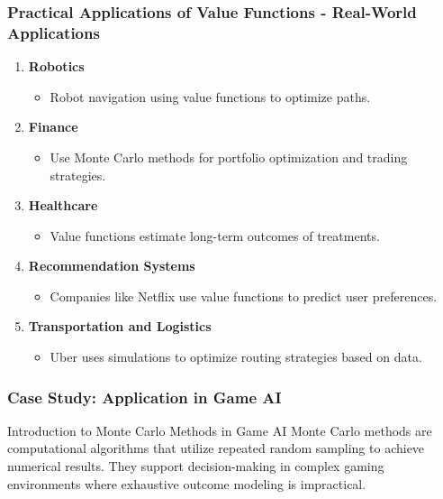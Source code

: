 \documentclass[aspectratio=169]{beamer}
\begin{document}
\begin{frame}[fragile]
  \frametitle{Practical Applications of Value Functions - Real-World Applications}
  
  \begin{enumerate}
    \item \textbf{Robotics}
      \begin{itemize}
        \item Robot navigation using value functions to optimize paths.
      \end{itemize}
      
    \item \textbf{Finance}
      \begin{itemize}
        \item Use Monte Carlo methods for portfolio optimization and trading strategies.
      \end{itemize}

    \item \textbf{Healthcare}
      \begin{itemize}
        \item Value functions estimate long-term outcomes of treatments.
      \end{itemize}
      
    \item \textbf{Recommendation Systems}
      \begin{itemize}
        \item Companies like Netflix use value functions to predict user preferences.
      \end{itemize}
      
    \item \textbf{Transportation and Logistics}
      \begin{itemize}
        \item Uber uses simulations to optimize routing strategies based on data.
      \end{itemize}
  \end{enumerate}
\end{frame}

\begin{frame}[fragile]
  \frametitle{Case Study: Application in Game AI}
  \begin{block}{Introduction to Monte Carlo Methods in Game AI}
    Monte Carlo methods are computational algorithms that utilize repeated random sampling to achieve numerical results. They support decision-making in complex gaming environments where exhaustive outcome modeling is impractical.
  \end{block}
\end{frame}
\end{document}
